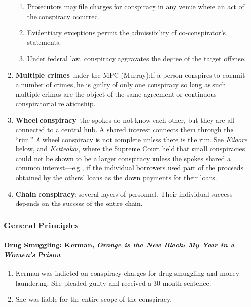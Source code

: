 \begin{enumerate}
\begin{enumerate}
        \item Prosecutors may file charges for conspiracy in any venue where 
        an act of the conspiracy occurred.
        \item Evidentiary exceptions permit the admissibility of 
        co-conspirator's statements.
        \item Under federal law, conspiracy aggravates the degree of the 
        target offense.
    \end{enumerate}
    \item \textbf{Multiple crimes} under the MPC (Murray):If a person 
    conspires to commit a number of crimes, he is guilty of only one 
    conspiracy so long as such multiple crimes are the object of the same 
    agreement or continuous conspiratorial relationship.
    \item \textbf{Wheel conspiracy}: the spokes do not know each other, but 
    they are all connected to a central hub. A shared interest connects them 
    through the ``rim.'' A wheel conspiracy is not complete unless there is 
    the rim. See \emph{Kilgore} below, and \emph{Kotteakos}, where the Supreme 
    Court held that small conspiracies could not be shown to be a larger 
    conspiracy unless the spokes shared a common interest---e.g., if the 
    individual borrowers used part of the proceeds obtained by the others' 
    loans as the down payments for their loans.
    \item \textbf{Chain conspiracy}: several layers of personnel. Their 
    individual success depends on the success of the entire chain.
\end{enumerate}

\subsubsection{General Principles}

\paragraph{Drug Smuggling: Kerman, \emph{Orange is the New Black: My Year in a 
Women's Prison}}

\begin{enumerate}
    \item Kerman was indicted on conspiracy charges for drug smuggling and 
    money laundering. She pleaded guilty and received a 30-month sentence.
    \item She was liable for the entire scope of the conspiracy.
\end{enumerate}

